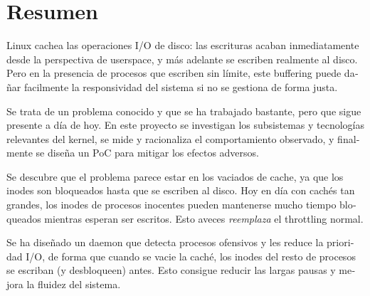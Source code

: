 \documentclass[a4paper,12pt]{article}
\begin{document}
\clearpage
{}
{}
\section*{Resumen}

\begin{otherlanguage}{spanish}
Linux cachea las operaciones I/O de disco: las escrituras acaban inmediatamente desde la perspectiva de userspace, y más adelante se escriben realmente al disco. Pero en la presencia de procesos que escriben sin límite, este buffering puede dañar facilmente la responsividad del sistema si no se gestiona de forma justa.

Se trata de un problema conocido y que se ha trabajado bastante, pero que sigue presente a día de hoy. En este proyecto se investigan los subsistemas y tecnologías relevantes del kernel, se mide y racionaliza el comportamiento observado, y finalmente se diseña un PoC para mitigar los efectos adversos.

Se descubre que el problema parece estar en los vaciados de cache, ya que los inodes son bloqueados hasta que se escriben al disco. Hoy en día con cachés tan grandes, los inodes de procesos inocentes pueden mantenerse mucho tiempo bloqueados mientras esperan ser escritos. Esto aveces \emph{reemplaza} el throttling normal.

Se ha diseñado un daemon que detecta procesos ofensivos y les reduce la prioridad I/O, de forma que cuando se vacie la caché, los inodes del resto de procesos se escriban (y desbloqueen) antes. Esto consigue reducir las largas pausas y mejora la fluidez del sistema.
\end{otherlanguage}


\clearpage


\newpage
{\hypersetup{linkcolor=black}
\tableofcontents
}

\newpage
{\hypersetup{linkcolor=black}
\listoffigures
\listoflistings
\listoftables
}


\clearpage


\clearpage


\clearpage



\clearpage


\clearpage


\clearpage

\medskip



\clearpage
\newpage
\begin{appendices}



\end{appendices}

\cleardoublepage
{}
{}
\printacronyms[include=abbrev,name=Glossary]
\end{document}
